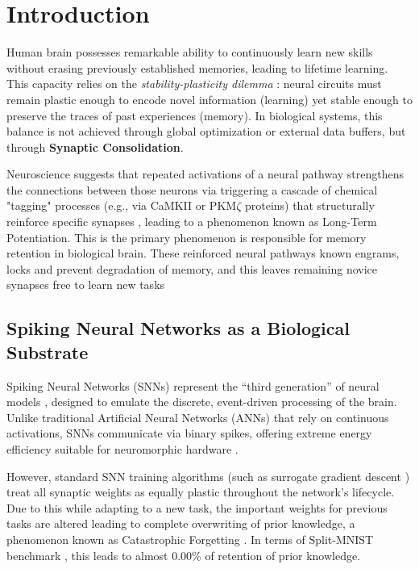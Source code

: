 \documentclass[5p,times]{elsarticle}
\begin{document}
\section{Introduction}
Human brain possesses remarkable ability to continuously learn new skills without erasing previously established memories, leading to lifetime learning. This capacity relies on the \textit{stability-plasticity dilemma} \cite{Mermillod2013}: neural circuits must remain plastic enough to encode novel information (learning) yet stable enough to preserve the traces of past experiences (memory). In biological systems, this balance is not achieved through global optimization or external data buffers, but through \textbf{Synaptic Consolidation}.

Neuroscience suggests that repeated activations of a neural pathway strengthens the connections between those neurons via triggering a cascade of chemical "tagging" processes (e.g., via CaMKII or PKM$\zeta$ proteins) that structurally reinforce specific synapses \cite{Clopath2010, Frankland2005}, leading to a phenomenon known as Long-Term Potentiation. This is the primary phenomenon is responsible for memory retention in biological brain. These reinforced neural pathways known engrams, locks and prevent degradation of memory, and this leaves remaining novice synapses free to learn new tasks

\subsection{Spiking Neural Networks as a Biological Substrate}
Spiking Neural Networks (SNNs) represent the ``third generation'' of neural models \cite{Maass1997}, designed to emulate the discrete, event-driven processing of the brain. Unlike traditional Artificial Neural Networks (ANNs) that rely on continuous activations, SNNs communicate via binary spikes, offering extreme energy efficiency suitable for neuromorphic hardware \cite{Roy2019, Davies2018}. 

However, standard SNN training algorithms (such as surrogate gradient descent \cite{Neftci2019}) treat all synaptic weights as equally plastic throughout the network's lifecycle. Due to this while adapting to a new task, the important weights for previous tasks are altered leading to complete overwriting of prior knowledge, a phenomenon known as Catastrophic Forgetting \cite{McCloskey1989}. In terms of Split-MNIST benchmark \cite{Zenke2017}, this leads to almost 0.00\% of retention of prior knowledge.
\end{document}
